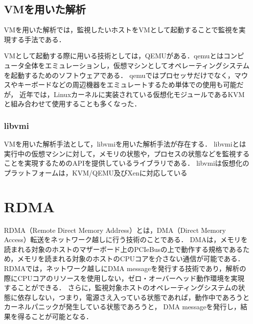 \subsection{VMを用いた解析}

VMを用いた解析では，監視したいホストをVMとして起動することで監視を実現する手法である．

VMとして起動する際に用いる技術としては，QEMU\cite{qemu}がある．qemuとはコンピュータ全体をエミュレーションし，仮想マシンとしてオペレーティングシステムを起動するためのソフトウェアである．
qemuではプロセッサだけでなく，マウスやキーボードなどの周辺機器をエミュレートするため単体での使用も可能だが，
近年では，Linuxカーネルに実装されている仮想化モジュールであるKVM\cite{kvm}と組み合わせて使用することも多くなった．



\subsubsection{libvmi}

VMを用いた解析手法として，libvmi\cite{osti_1334968}を用いた解析手法が存在する．
libvmiとは実行中の仮想マシンに対して，メモリの状態や，プロセスの状態などを監視することを実現するためのAPIを提供しているライブラリである．
libvmiは仮想化のプラットフォームは，KVM/QEMU及びXenに対応している


\section{RDMA}

RDMA（Remote Direct Memory Address）とは，DMA（Direct Memory Access）\cite{amini1995system}転送をネットワーク越しに行う技術のことである．
DMAは，メモリを読まれる対象のホストのマザーボード上のPCIeBusの上で動作する規格であるため，メモリを読まれる対象のホストのCPUコアを介さない通信が可能である．
RDMAでは，ネットワーク越しにDMA messageを発行する技術であり，解析の際にCPUコアのリソースを使用しない，ゼロ・オーバーヘッド動作環境を実現することができる．
さらに，監視対象ホストのオペレーティングシステムの状態に依存しない，つまり，電源さえ入っている状態であれば，動作中であろうとカーネルパニックが発生している状態であろうと，
DMA messageを発行し，結果を得ることが可能となる．

